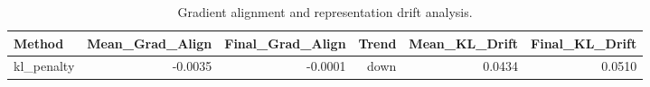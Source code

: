\begin{table}[htbp]
\centering
\caption{Gradient alignment and representation drift analysis.}
\label{tab:gradient}
\begin{tabular}{lrrrrr}
\toprule
\textbf{Method} & \textbf{Mean\_Grad\_Align} & \textbf{Final\_Grad\_Align} & \textbf{Trend} & \textbf{Mean\_KL\_Drift} & \textbf{Final\_KL\_Drift} \\
\midrule
kl\_penalty & -0.0035 & -0.0001 & down & 0.0434 & 0.0510 \\
\bottomrule
\end{tabular}
\end{table}